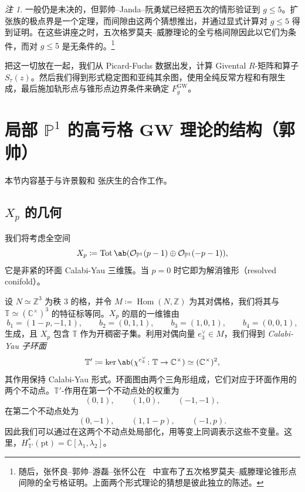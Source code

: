 \documentclass{amsart}
\theoremstyle{definition}
\theoremstyle{remark}
\newtheorem{rmk}[thm]{注}
\theoremstyle{plain}
\theoremstyle{definition}
\theoremstyle{remark}
\newcommand{\C}{\mathbb{C}}
\newcommand{\Z}{\mathbb{Z}}
\renewcommand{\P}{\mathbb{P}}
\newcommand{\mc}[1]{\mathcal{#1}}
\newcommand{\T}{\mathbb{T}}
\newcommand{\mr}[1]{\mathrm{#1}}
\newcommand{\on}[1]{\operatorname{#1}}
\newcommand{\1}{\mathbf{1}}
\newcommand{\2}{\mathbf{2}}
\newcommand{\3}{\mathbf{3}}
\DeclareMathOperator{\Hom}{Hom}
\begin{document}
\begin{rmk}
     一般仍是未决的，但郭帅–Janda–阮勇斌已经把五次的情形验证到 \(g \leq 5\)。扩张族的极点界是一个定理，而间隙由这两个猜想推出，并通过显式计算对 \(g \leq 5\) 得到证明。在这些讲座之时，五次格罗莫夫–威滕理论的全亏格间隙因此以它们为条件，而对 \(g \leq 5\) 是无条件的。\footnote{随后，张怀良–郭帅–游磊–张怀公在~\cite{CGYZ2026} 中宣布了五次格罗莫夫–威滕理论锥形点间隙的全亏格证明。上面两个形式理论的猜想是彼此独立的陈述。}
\end{rmk}

把这一切放在一起，我们从 Picard-Fuchs 数据出发，计算 Givental \(R\)-矩阵和算子 \(S_{\tau}(z)\)。然后我们得到形式稳定图和亚纯其余图，使用全纯反常方程和有限生成，最后施加轨形点与锥形点边界条件来确定 \(F_g^{\mr{GW}}\)。
\section{\texorpdfstring{局部 \(\P^1\) 的高亏格 GW 理论的结构（郭帅）}{局部 P1 的高亏格 GW 理论的结构（郭帅）}}%
\label{sec:Structure of higher-genus GW theory of local P1 (Shuai Guo)}

本节内容基于与许景毅和 张庆生的合作工作。

\subsection{\(X_p\) 的几何}%
\label{sub:The geometry of Xp}

我们将考虑全空间
\[ X_p \coloneqq \on{Tot}\ab(\mc{O}_{\P^1}(p-1) \oplus \mc{O}_{\P^1}(-p-1)), \]
它是非紧的环面 Calabi-Yau 三维簇。当 \(p = 0\) 时它即为解消锥形（resolved conifold）。

设 \(N \simeq \Z^3\) 为秩 \(3\) 的格，并令 \(M \coloneqq \Hom(N,\Z)\) 为其对偶格，我们将其与 \(\T \simeq (\C^{\times})^3\) 的特征标等同。\(X_p\) 的扇的一维锥由
\[ b_1 = (1-p,-1,1), \qquad b_2 = (0,1,1), \qquad b_3 = (1,0,1), \qquad b_4 = (0,0,1), \]
生成，且 \(X_p\) 包含 \(\T\) 作为开稠密子集。利用对偶向量 \(e_3^{\vee} \in M\)，我们得到 \textit{Calabi-Yau 子环面}
\[ \T' \coloneqq \ker\ab(\chi^{e_3^{\vee}} \colon \T \to \C^{\times}) \simeq (\C^{\times})^2, \]
其作用保持 Calabi-Yau 形式。环面图由两个三角形组成，它们对应于环面作用的两个不动点。\(\T'\)-作用在第一个不动点处的权重为
\[ (0,1), \qquad (1,0), \qquad (-1,-1), \]
在第二个不动点处为
\[ (0,-1), \qquad (1,1-p), \qquad (-1,p). \]
因此我们可以通过在这两个不动点处局部化，用等变上同调表示这些不变量。这里，\(H^*_{\T'}(\mr{pt}) = \C[\lambda_1,\lambda_2]\)。
\end{document}

